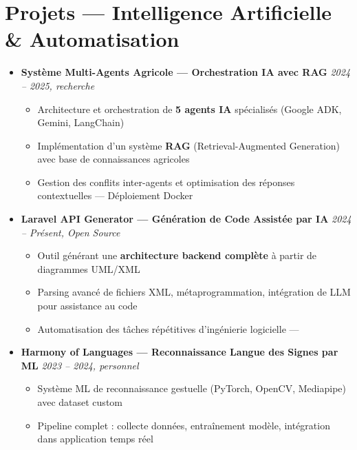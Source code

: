\documentclass[a4paper,11pt]{article}
\begin{document}
\section{Projets — Intelligence Artificielle \& Automatisation}
\begin{itemize}[leftmargin=*, label={}]

    \item \textbf{Système Multi-Agents Agricole — Orchestration IA avec RAG} \hfill \textit{2024 -- 2025, recherche}
    \vspace{-2pt}
    \begin{itemize}[leftmargin=0.4cm, nosep, label=\tiny$\bullet$]
        \item \small{Architecture et orchestration de \textbf{5 agents IA} spécialisés (Google ADK, Gemini, LangChain)}
        \item \small{Implémentation d'un système \textbf{RAG} (Retrieval-Augmented Generation) avec base de connaissances agricoles}
        \item \small{Gestion des conflits inter-agents et optimisation des réponses contextuelles — Déploiement Docker}
    \end{itemize}
    \vspace{4pt}

    \item \textbf{Laravel API Generator — Génération de Code Assistée par IA} \hfill \textit{2024 -- Présent, Open Source}
    \vspace{-2pt}
    \begin{itemize}[leftmargin=0.4cm, nosep, label=\tiny$\bullet$]
        \item \small{Outil générant une \textbf{architecture backend complète} à partir de diagrammes UML/XML}
        \item \small{Parsing avancé de fichiers XML, métaprogrammation, intégration de LLM pour assistance au code}
        \item \small{Automatisation des tâches répétitives d'ingénierie logicielle — \href{https://github.com/Nameless0l/laravel-api-generator}{\faGithub}}
    \end{itemize}
    \vspace{4pt}

    \item \textbf{Harmony of Languages — Reconnaissance Langue des Signes par ML} \hfill \textit{2023 -- 2024, personnel}
    \vspace{-2pt}
    \begin{itemize}[leftmargin=0.4cm, nosep, label=\tiny$\bullet$]
        \item \small{Système ML de reconnaissance gestuelle (PyTorch, OpenCV, Mediapipe) avec dataset custom}
        \item \small{Pipeline complet : collecte données, entraînement modèle, intégration dans application temps réel}
    \end{itemize}

\end{itemize}
\end{document}
